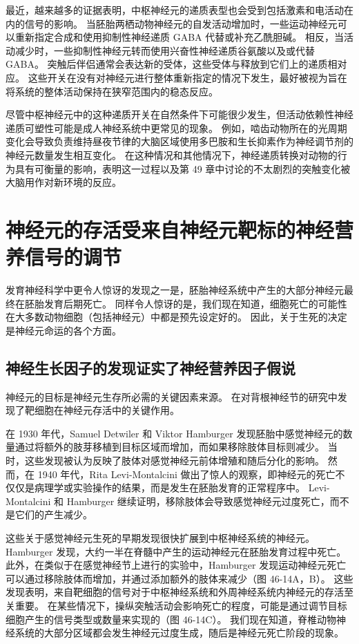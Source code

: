 最近，越来越多的证据表明，中枢神经元的递质表型也会受到包括激素和电活动在内的信号的影响。 当胚胎两栖动物神经元的自发活动增加时，一些运动神经元可以重新指定合成和使用抑制性神经递质 GABA 代替或补充乙酰胆碱。 相反，当活动减少时，一些抑制性神经元转而使用兴奋性神经递质谷氨酸以及或代替 GABA。 突触后伴侣通常会表达新的受体，这些受体与释放到它们上的递质相对应。 这些开关在没有对神经元进行整体重新指定的情况下发生，最好被视为旨在将系统的整体活动保持在狭窄范围内的稳态反应。

尽管中枢神经元中的这种递质开关在自然条件下可能很少发生，但活动依赖性神经递质可塑性可能是成人神经系统中更常见的现象。 例如，啮齿动物所在的光周期变化会导致负责维持昼夜节律的大脑区域使用多巴胺和生长抑素作为神经调节剂的神经元数量发生相互变化。 在这种情况和其他情况下，神经递质转换对动物的行为具有可衡量的影响，表明这一过程以及第 49 章中讨论的不太剧烈的突触变化被大脑用作对新环境的反应。


\section{神经元的存活受来自神经元靶标的神经营养信号的调节}
发育神经科学中更令人惊讶的发现之一是，胚胎神经系统中产生的大部分神经元最终在胚胎发育后期死亡。 同样令人惊讶的是，我们现在知道，细胞死亡的可能性在大多数动物细胞（包括神经元）中都是预先设定好的。 因此，关于生死的决定是神经元命运的各个方面。

\subsection{神经生长因子的发现证实了神经营养因子假说}
神经元的目标是神经元生存所必需的关键因素来源。 在对背根神经节的研究中发现了靶细胞在神经元存活中的关键作用。

在 1930 年代，Samuel Detwiler 和 Viktor Hamburger 发现胚胎中感觉神经元的数量通过将额外的肢芽移植到目标区域而增加，而如果移除肢体目标则减少。 当时，这些发现被认为反映了肢体对感觉神经元前体增殖和随后分化的影响。 然而，在 1940 年代，Rita Levi-Montalcini 做出了惊人的观察，即神经元的死亡不仅仅是病理学或实验操作的结果，而是发生在胚胎发育的正常程序中。 Levi-Montalcini 和 Hamburger 继续证明，移除肢体会导致感觉神经元过度死亡，而不是它们的产生减少。

这些关于感觉神经元生死的早期发现很快扩展到中枢神经系统的神经元。 Hamburger 发现，大约一半在脊髓中产生的运动神经元在胚胎发育过程中死亡。 此外，在类似于在感觉神经节上进行的实验中，Hamburger 发现运动神经元死亡可以通过移除肢体而增加，并通过添加额外的肢体来减少（图 46-14A，B）。 这些发现表明，来自靶细胞的信号对于中枢神经系统和外周神经系统内神经元的存活至关重要。 在某些情况下，操纵突触活动会影响死亡的程度，可能是通过调节目标细胞产生的信号类型或数量来实现的（图 46-14C）。 我们现在知道，脊椎动物神经系统的大部分区域都会发生神经元过度生成，随后是神经元死亡阶段的现象。

